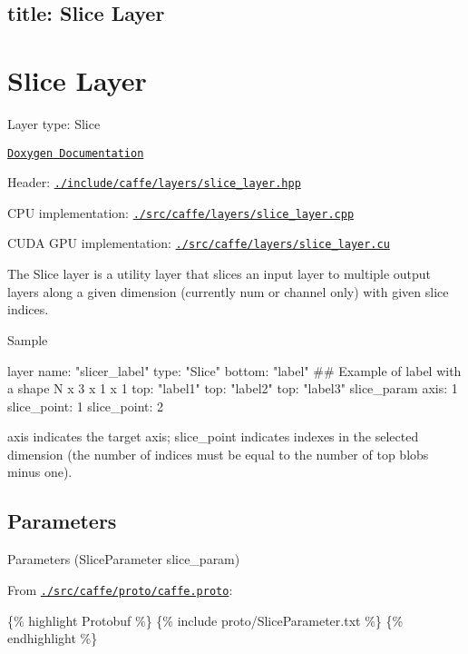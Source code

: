 

 \subsection*{title\+: Slice Layer }

\section*{Slice Layer}


\begin{DoxyItemize}
\item Layer type\+: {\ttfamily Slice}
\item \href{http://caffe.berkeleyvision.org/doxygen/classcaffe_1_1SliceLayer.html}{\tt Doxygen Documentation}
\item Header\+: \href{https://github.com/BVLC/caffe/blob/master/include/caffe/layers/slice_layer.hpp}{\tt {\ttfamily ./include/caffe/layers/slice\+\_\+layer.hpp}}
\item C\+PU implementation\+: \href{https://github.com/BVLC/caffe/blob/master/src/caffe/layers/slice_layer.cpp}{\tt {\ttfamily ./src/caffe/layers/slice\+\_\+layer.cpp}}
\item C\+U\+DA G\+PU implementation\+: \href{https://github.com/BVLC/caffe/blob/master/src/caffe/layers/slice_layer.cu}{\tt {\ttfamily ./src/caffe/layers/slice\+\_\+layer.cu}}
\end{DoxyItemize}

The {\ttfamily Slice} layer is a utility layer that slices an input layer to multiple output layers along a given dimension (currently num or channel only) with given slice indices.


\begin{DoxyItemize}
\item Sample \begin{DoxyVerb}layer {
  name: "slicer_label"
  type: "Slice"
  bottom: "label"
  ## Example of label with a shape N x 3 x 1 x 1
  top: "label1"
  top: "label2"
  top: "label3"
  slice_param {
    axis: 1
    slice_point: 1
    slice_point: 2
  }
}
\end{DoxyVerb}

\end{DoxyItemize}

{\ttfamily axis} indicates the target axis; {\ttfamily slice\+\_\+point} indicates indexes in the selected dimension (the number of indices must be equal to the number of top blobs minus one).

\subsection*{Parameters}


\begin{DoxyItemize}
\item Parameters ({\ttfamily Slice\+Parameter slice\+\_\+param})
\item From \href{https://github.com/BVLC/caffe/blob/master/src/caffe/proto/caffe.proto}{\tt {\ttfamily ./src/caffe/proto/caffe.proto}}\+:
\end{DoxyItemize}

\{\% highlight Protobuf \%\} \{\% include proto/\+Slice\+Parameter.\+txt \%\} \{\% endhighlight \%\} 